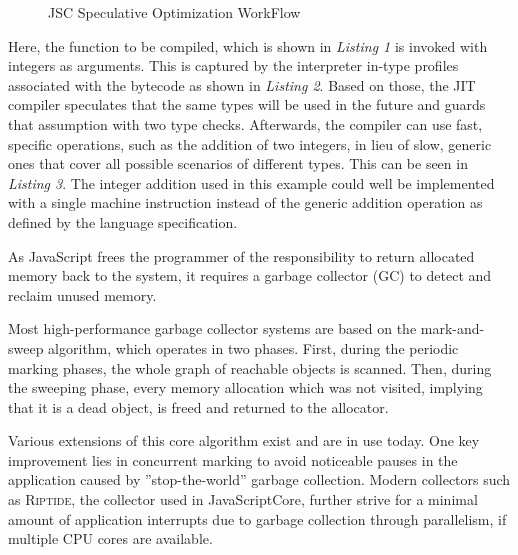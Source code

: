 \begin{figure}[!t]
\begin{center}
    \vspace{-5em}
    \begin{minipage}{\dimexpr\paperwidth}
    \def\svgwidth{\paperwidth}
    \scalebox{0.85}{}\vspace{-2em}
    \end{minipage}
\end{center}
\caption{JSC Speculative Optimization WorkFlow}
\end{figure}

\noindent
Here, the function to be compiled, which is shown in \textit{Listing 1} is invoked with integers as arguments. This is
captured by the interpreter in-type profiles associated with the bytecode as shown in \textit{Listing 2}.
Based on those, the JIT compiler speculates that the same types will be used in the future and guards
that assumption with two type checks. Afterwards, the compiler can use fast, specific operations, such
as the addition of two integers, in lieu of slow, generic ones that cover all possible scenarios of
different types. This can be seen in \textit{Listing 3}. The integer addition used in this example could well
be implemented with a single machine instruction instead of the generic addition operation as defined
by the language specification.%

%
As JavaScript frees the programmer of the responsibility to return allocated memory back
to the system, it requires a garbage collector (GC) to detect and reclaim unused memory.%

\noindent
Most high-performance garbage collector systems are based on the mark-and-sweep algorithm, which
operates in two phases. First, during the periodic marking phases, the whole graph of reachable
objects is scanned. Then, during the sweeping phase, every memory allocation which was not visited,
implying that it is a dead object, is freed and returned to the allocator.%

\noindent
Various extensions of this core algorithm exist and are in use today. One key improvement lies
in concurrent marking to avoid noticeable pauses in the application caused by ”stop-the-world”
garbage collection. Modern collectors such as \textsc{Riptide}\protect\footnotemark, the collector used in
JavaScriptCore, further strive for a minimal amount of application interrupts due to garbage
collection through parallelism, if multiple CPU cores are available.

